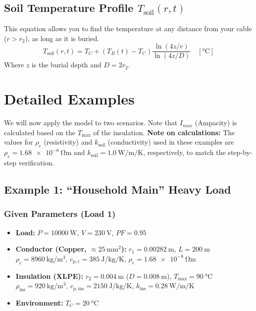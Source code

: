\documentclass[11pt, a4paper]{article}
\begin{document}
\subsection{Soil Temperature Profile $T_{\text{soil}}(r, t)$}
This equation allows you to find the temperature at any distance from your cable ($r > r_2$), as long as it is buried.
\begin{equation}
    T_{\text{soil}}(r, t) = T_C + \left( T_B(t) - T_C \right) \frac{\ln(4z/r)}{\ln(4z/D)} \quad [\si{\celsius}]
\end{equation}
Where $z$ is the burial depth and $D = 2r_2$.

\newpage

\section{Detailed Examples}
We will now apply the model to two scenarios. Note that $I_{max}$ (Ampacity) is calculated based on the $T_{\text{max}}$ of the insulation. 
\textbf{Note on calculations:} The values for $\rho_e$ (resistivity) and $k_{\text{soil}}$ (conductivity) used in these examples are $\rho_e = \SI{1.68e-8}{\ohm\metre}$ and $k_{\text{soil}}=\SI{1.0}{\watt\per\metre\per\kelvin}$, respectively, to match the step-by-step verification.

\subsection{Example 1: ``Household Main'' Heavy Load}

\subsubsection{Given Parameters (Load 1)}
\begin{itemize}
    \item \textbf{Load:} $P = \SI{10000}{\watt}$, $V = \SI{230}{\volt}$, $PF = 0.95$
    \item \textbf{Conductor (Copper, $\approx \SI{25}{\square\mm}$):}
        $r_1 = \SI{0.00282}{\metre}$, $L = \SI{200}{\metre}$ \\
        $\rho_c = \SI{8960}{\kilogram\per\cubic\metre}$, $c_{p,c} = \SI{385}{\joule\per\kilogram\per\kelvin}$, $\rho_e = \SI{1.68e-8}{\ohm\metre}$
    \item \textbf{Insulation (XLPE):}
        $r_2 = \SI{0.004}{\metre}$ ($D = \SI{0.008}{\metre}$), $T_{\text{max}} = \SI{90}{\celsius}$ \\
        $\rho_{\text{ins}} = \SI{920}{\kilogram\per\cubic\metre}$, $c_{p,\text{ins}} = \SI{2150}{\joule\per\kilogram\per\kelvin}$, $k_{\text{ins}} = \SI{0.28}{\watt\per\metre\per\kelvin}$
    \item \textbf{Environment:} $T_C = \SI{20}{\celsius}$
\end{itemize}
\end{document}
